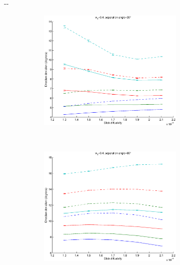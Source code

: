 \documentclass{article}
\begin{document}
\begin{figure}[H]
\begin{adjustwidth}{-\oddsidemargin}{-\rightmargin}
    \begin{subfigure}{0.8\paperwidth}
      \begin{subfigure}{0.3\textwidth}
        \centering
        \includegraphics[width=\textwidth]{figures/synth_modbas_diffus__snr=20__w1=4__angle=30.eps}
      \end{subfigure}
      ~
      \begin{subfigure}{0.3\textwidth}
        \centering
        \includegraphics[width=\textwidth]{figures/synth_modbas_diffus__snr=20__w1=4__angle=60.eps}
      \end{subfigure}

\end{subfigure}
\end{adjustwidth}
\end{figure}
\end{document}
